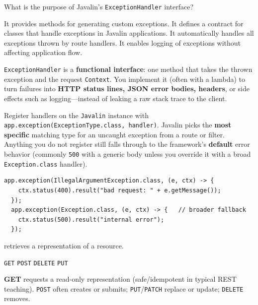 \question[4]
What is the purpose of Javalin's \texttt{ExceptionHandler} interface?
\begin{choices}
  \choice It provides methods for generating custom exceptions.
  \CorrectChoice It defines a contract for classes that handle exceptions in Javalin applications.
  \choice It automatically handles all exceptions thrown by route handlers.
  \choice It enables logging of exceptions without affecting application flow.
\end{choices}
\begin{solution}
  \texttt{ExceptionHandler} is a \textbf{functional interface}: one method that takes the thrown exception and the request \texttt{Context}. You implement it (often with a lambda) to turn failures into \textbf{HTTP status lines, JSON error bodies, headers}, or side effects such as logging---instead of leaking a raw stack trace to the client.

  Register handlers on the \texttt{Javalin} instance with \texttt{app.exception(ExceptionType.class, handler)}. Javalin picks the \textbf{most specific} matching type for an uncaught exception from a route or filter. Anything you do not register still falls through to the framework's \textbf{default} error behavior (commonly \texttt{500} with a generic body unless you override it with a broad \texttt{Exception.class} handler).

  \begin{lstlisting}[style=java]
  app.exception(IllegalArgumentException.class, (e, ctx) -> {
    ctx.status(400).result("bad request: " + e.getMessage());
  });
  app.exception(Exception.class, (e, ctx) -> {   // broader fallback
    ctx.status(500).result("internal error");
  });
  \end{lstlisting}
\end{solution}

\newpage


\question[4]
\blank[3.5em] retrieves a representation of a resource.
\begin{choices}
  \CorrectChoice \texttt{GET}
  \choice \texttt{POST}
  \choice \texttt{DELETE}
  \choice \texttt{PUT}
\end{choices}
\begin{solution}
  \textbf{GET} requests a read-only representation (safe/idempotent in typical REST teaching). \texttt{POST} often creates or submits; \texttt{PUT}/\texttt{PATCH} replace or update; \texttt{DELETE} removes.
\end{solution}


